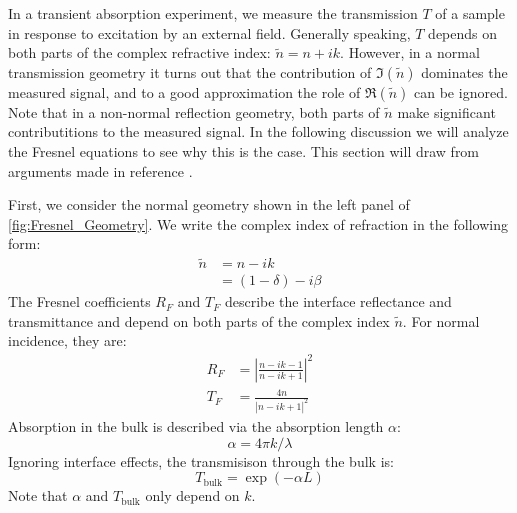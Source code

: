 In a transient absorption experiment, we measure the transmission $T$ of a sample in response to excitation by an external field. Generally speaking, $T$ depends on both parts of the complex refractive index: $\tilde{n} = n + i k$. However, in a normal transmission geometry it turns out that the contribution of $\Im(\tilde{n})$ dominates the measured signal, and to a good approximation the role of $\Re(\tilde{n})$ can be ignored. Note that in a non-normal reflection geometry, both parts of $\tilde{n}$ make significant contributitions to the measured signal. In the following discussion we will analyze the Fresnel equations to see why this is the case. This section will draw from arguments made in reference \cite{nichelattiComplexRefractiveIndex2002}.

First, we consider the normal geometry shown in the left panel of \cref{fig:Fresnel_Geometry}. We write the complex index of refraction in the following form:
\begin{equation}
\begin{aligned}
\tilde{n} &= n - i k \\
&= (1-\delta) - i \beta
\end{aligned}
\label{eqn:complex_index}
\end{equation}
The Fresnel coefficients $R_F$ and $T_F$ describe the interface reflectance and transmittance and depend on both parts of the complex index $\tilde{n}$. For normal incidence, they are:
\begin{equation}
\begin{aligned}
R_F &= \left| \frac{n-ik-1}{n-ik+1}   \right|^2 \\
T_F &=  \frac{4n}{\left|n-ik+1\right|^2}
\end{aligned}
\label{eqn:fresnel_normal}
\end{equation}
Absorption in the bulk is described via the absorption length $\alpha$:
\begin{equation}
\alpha = 4 \pi k / \lambda
\end{equation}
Ignoring interface effects, the transmisison through the bulk is:
\begin{equation}
T_{\text{bulk}} = \exp( - \alpha L)
\end{equation}
Note that $\alpha$ and $T_{\text{bulk}}$ only depend on $k$.

